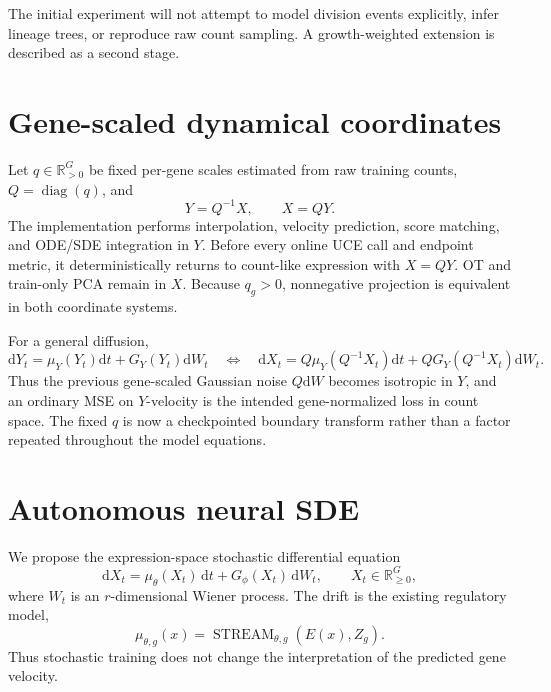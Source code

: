 \documentclass[11pt]{article}
\newcommand{\uce}{UCE}
\newcommand{\R}{\mathbb{R}}
\newcommand{\dd}{\mathrm{d}}
\begin{document}
The initial experiment will not attempt to model division events explicitly,
infer lineage trees, or reproduce raw count sampling. A growth-weighted
extension is described as a second stage.

\section{Gene-scaled dynamical coordinates}

Let $q\in\R^G_{>0}$ be fixed per-gene scales estimated from raw training
counts, $Q=\operatorname{diag}(q)$, and
\begin{equation}
  Y=Q^{-1}X,\qquad X=QY.
  \label{eq:scaled-coordinates}
\end{equation}
The implementation performs interpolation, velocity prediction, score
matching, and ODE/SDE integration in $Y$. Before every online \uce{} call and
endpoint metric, it deterministically returns to count-like expression with
$X=QY$. OT and train-only PCA remain in $X$. Because $q_g>0$, nonnegative
projection is equivalent in both coordinate systems.

For a general diffusion,
\begin{equation}
  \dd Y_t=\mu_Y(Y_t)\dd t+G_Y(Y_t)\dd W_t
  \quad\Longleftrightarrow\quad
  \dd X_t=Q\mu_Y(Q^{-1}X_t)\dd t+QG_Y(Q^{-1}X_t)\dd W_t.
  \label{eq:coordinate-sde}
\end{equation}
Thus the previous gene-scaled Gaussian noise $Q\dd W$ becomes isotropic in
$Y$, and an ordinary MSE on $Y$-velocity is the intended gene-normalized loss
in count space. The fixed $q$ is now a checkpointed boundary transform rather
than a factor repeated throughout the model equations.

\section{Autonomous neural SDE}

We propose the expression-space stochastic differential equation
\begin{equation}
  \dd X_t
  = \mu_\theta(X_t)\,\dd t
  + G_\phi(X_t)\,\dd W_t,
  \qquad X_t\in\R^G_{\geq 0},
  \label{eq:sde}
\end{equation}
where $W_t$ is an $r$-dimensional Wiener process. The drift is the existing
regulatory model,
\begin{equation}
  \mu_{\theta,g}(x)
  = \operatorname{STREAM}_{\theta,g}
    \!\left(E(x), Z_g\right).
  \label{eq:drift}
\end{equation}
Thus stochastic training does not change the interpretation of the predicted
gene velocity.
\end{document}
